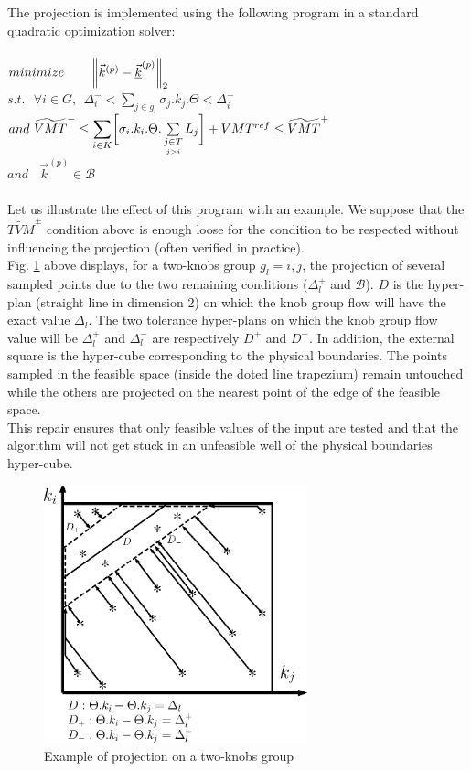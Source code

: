 The projection is implemented using the following program in a standard quadratic optimization solver:\\
\\
$minimize \ \ \ \ \ \ \norm{\vec{k}^{(p)}-\underline{\vec{k}}^{(p)}}_{2}$\\
$s.t.\ \ \ \forall i\in{G}, \ \ \Delta_{i}^{-}< \sum_{j\in{g_{i}}} \sigma_{j}.k_{j}.\Theta<\Delta_{i}^{+}$\\
$and\ \widetilde{VMT}^{-}\leq\mathlarger{\sum\limits_{i\in K}}\biggl[\sigma_{i}.k_{i}.\Theta.	\sum\limits_{\underset{j>i}{j\in T}}L_{j}\biggr]+VMT^{ref}\leq \widetilde{VMT}^{+}\nonumber $\\
$and\ \ \ \ \vec{k}^{(p)}\in \mathscr{B}$\\
\\
Let us illustrate the effect of this program with an example. We suppose that the $\widetilde{TVM}^{\pm}$ condition above is enough loose for the condition to be respected without influencing the projection (often verified in practice).\\
Fig. \ref{fig:proj} above displays, for a two-knobs group $g_{l}={i,j}$, the projection of several sampled points due to the two remaining conditions ($\Delta_{l}^{\pm}$ and $\mathscr{B}$). $D$ is the hyper-plan (straight line in dimension 2) on which the knob group flow will have the exact value $\Delta_{l}$.
The two tolerance hyper-plans on which the knob group flow value will be $\Delta_{l}^{+}$ and $\Delta_{l}^{-}$ are respectively $D^{+}$ and $D^{-}$.
In addition, the external square is the hyper-cube corresponding to the physical boundaries. 
The points sampled in the feasible space (inside the doted line trapezium) remain untouched while the others are projected on the nearest point of the edge of the feasible space.\\
This repair ensures that only feasible values of the input are tested and that the algorithm will not get stuck in an unfeasible well of the physical boundaries hyper-cube.\\
\begin{figure}
\centering
\includegraphics[width=3in]{figures/proj.eps}
\caption{Example of projection on a two-knobs group}
\label{fig:proj}
\end{figure}
